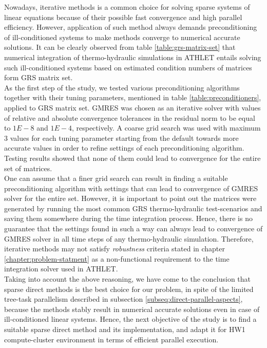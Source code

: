 \label{subseq:hybrid-method-description}

Nowadays, iterative methods is a common choice for solving sparse systems of linear equations because of their possible fast convergence and high parallel efficiency. However, application of such method always demands preconditioning of ill-conditioned systems to make methods converge to numerical accurate solutions. It can be clearly observed from table \ref{table:grs-matrix-set} that numerical integration of thermo-hydraulic simulations in ATHLET entails solving such ill-conditioned systems  based on estimated condition numbers of matrices form GRS matrix set.\\


As the first step of the study, we tested various preconditioning algorithms together with their tuning parameters, mentioned in table \ref{table:preconditioners}, applied to GRS matrix set. GMRES was chosen as an iterative solver with values of relative and absolute convergence tolerances in the residual norm to be equal to $1E-8$ and $1E-4$, respectively. A coarse grid search was used with maximum 3 values for each tuning parameter starting from the default towards more accurate values in order to refine settings of each preconditioning algorithm. Testing results showed that none of them could lead to convergence for the entire set of matrices.\\


One can assume that a finer grid search can result in finding a suitable preconditioning algorithm with settings that can lead to convergence of GMRES solver for the entire set. However, it is important to point out the matrices were generated by running the most common GRS thermo-hydraulic test-scenarios and saving them somewhere during the time integration process. Hence, there is no guarantee that the settings found in such a way can always lead to convergence of GMRES solver in all time steps of any thermo-hydraulic simulation. Therefore, iterative methods may not satisfy \textit{robustness} criteria stated in chapter \ref{chapter:problem-statment} as a non-functional requirement to the time integration solver used in ATHLET.\\


Taking into account the above reasoning, we have come to the conclusion that sparse direct methods is the best choice for our problem, in spite of the limited tree-task parallelism described in subsection \ref{subseq:direct-parallel-aspects}, because the methods stably result in numerical accurate solutions even in case of ill-conditioned linear systems. Hence, the next objective of the study is to find a suitable sparse direct method and its implementation, and adapt it for HW1 compute-cluster environment in terms of efficient parallel execution. \\